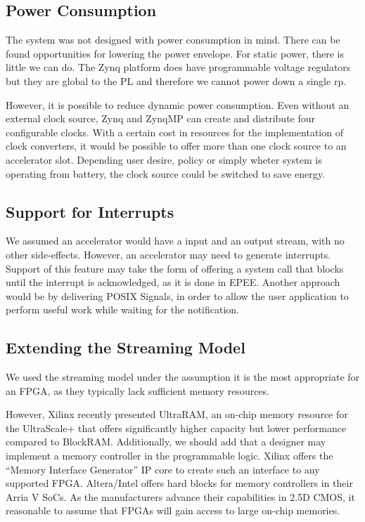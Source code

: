 
\subsection{Power Consumption}

The system was not designed with power consumption in mind. There can be found opportunities for lowering the power envelope.
For static power, there is little we can do. The Zynq platform does have programmable voltage regulators but they are global to the PL
and therefore we cannot power down a single \gls{rp}.

However, it is possible to reduce dynamic power consumption. Even without an external clock source, Zynq and ZynqMP can create and distribute
four configurable clocks. With a certain cost in resources for the implementation of clock converters, it would be possible to offer more than
one clock source to an accelerator slot. Depending user desire, policy or simply wheter system is operating from battery, the clock source 
could be switched to save energy.

\subsection{Support for Interrupts}

We assumed an accelerator would have a input and an output stream, with no other side-effects.
However, an accelerator may need to generate interrupts. Support of this feature may take the form of
offering a system call that blocks until the interrupt is acknowledged, as it is done in EPEE\cite{epee}.
Another approach would be by delivering POSIX Signals, in order to allow the user application to perform
useful work while waiting for the notification.

\subsection{Extending the Streaming Model}

We used the streaming model under the assumption it is the most appropriate for an FPGA, 
as they typically lack sufficient memory resources.

However, Xilinx recently presented UltraRAM, an on-chip memory resource for the UltraScale+
that offers significantly higher capacity but lower performance compared to BlockRAM. 
Additionally, we should add that a designer may implement a memory controller in the programmable logic.
Xilinx offers the ``Memory Interface Generator'' IP core to create such an interface to any supported FPGA.
Altera/Intel offers hard blocks for memory controllers in their Arria V SoCs.
As the manufacturers advance their capabilities in 2.5D CMOS, it reasonable to assume that FPGAs will
gain access to large on-chip memories. 

